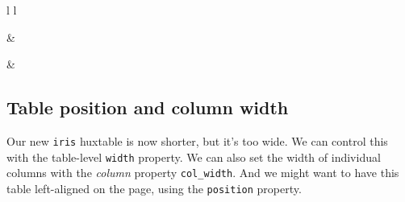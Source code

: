 \documentclass[]{article}
\begin{document}
\begin{table}[ht]
\begin{centerbox}
\begin{threeparttable}
\begin{tabular}{l l}

 &
 \tabularnewline[-0.5pt]



 &
 \tabularnewline[-0.5pt]


\end{tabular}
\end{threeparttable}\par\end{centerbox}

\end{table}
 

\FloatBarrier

\hypertarget{table-position-and-column-width}{%
\subsection{Table position and column
width}\label{table-position-and-column-width}}

Our new \texttt{iris} huxtable is now shorter, but it's too wide. We can
control this with the table-level \texttt{width} property. We can also
set the width of individual columns with the \emph{column} property
\texttt{col\_width}. And we might want to have this table left-aligned
on the page, using the \texttt{position} property.
\end{document}
